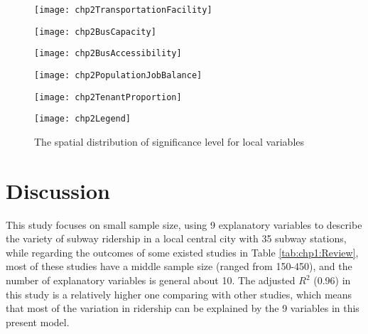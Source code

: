 \begin{figure}[htbp]
	\begin{minipage}{0.48\linewidth}
		\centering
		\texttt{[image: chp2TransportationFacility]} %
	\end{minipage}
	\hfill %
	\begin{minipage}{0.48\linewidth}
		\centering
		\texttt{[image: chp2BusCapacity]}
	\end{minipage}
	
	\vfill %
	
	\begin{minipage}{0.48\linewidth}
		\centering
		\texttt{[image: chp2BusAccessibility]}
	\end{minipage}
	\hfill
	\begin{minipage}{0.48\linewidth}
		\centering
		\texttt{[image: chp2PopulationJobBalance]}
	\end{minipage}
	
	\vfill
	
	\begin{minipage}{0.48\linewidth}
		\centering
		\texttt{[image: chp2TenantProportion]}
	\end{minipage}
	\hfill
	\begin{minipage}[c]{0.48\linewidth}
		\centering
		\texttt{[image: chp2Legend]}\\
	\end{minipage}
	
	\caption{The spatial distribution of significance level for local variables}
	\label{fig:chp2:SignificanceDistribution}
\end{figure}

%
\section{Discussion}
%
This study focuses on small sample size, using 9 explanatory variables to describe the variety of subway ridership in a local central city with 35 subway stations, while regarding the outcomes of some existed studies in Table \ref{tab:chp1:Review}, most of these studies have a middle sample size (ranged from 150-450), and the number of explanatory variables is general about 10. The adjusted $R^2$ (0.96) in this study is a relatively higher one comparing with other studies, which means that most of the variation in ridership can be explained by the 9 variables in this present model. 

